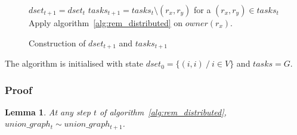 \documentclass[12px]{article}
\newtheorem{lemma}[theorem]{Lemma}
\begin{document}
        \begin{figure}
          \centering
          \begin{minipage}{8cm}
            \begin{algorithm}[H]
              \caption{Construction of $dset_{t+1}$ and $tasks_{t+1}$}%
              \label{alg:construct_dset_tasks}
              \begin{algorithmic}[1]
                \State $dset_{t+1} = dset_t$
                \State $tasks_{t+1} = tasks_t \setminus (r_x, r_y)$ for a $(r_x, r_y) \in tasks_t$
                \State Apply algorithm~\ref{alg:rem_distributed} on $owner(r_x)$.
              \end{algorithmic}
            \end{algorithm}
          \end{minipage}
        \end{figure}

        The algorithm is initialised with state $dset_0 = \{(i, i)~/~i \in V\}$ and $tasks = G$.

      \subsubsection{Proof}
        \begin{lemma}%
          \label{lemma:transitivity}
          At any step $t$ of algorithm~\ref{alg:rem_distributed}, $union\_graph_t \sim union\_graph_{t+1}$.
        \end{lemma}
\end{document}
